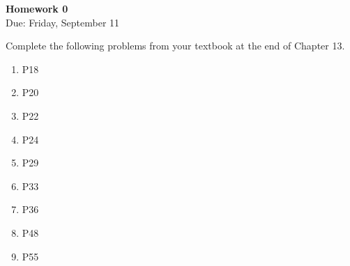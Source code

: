 \documentclass{article}
\begin{document}
\fancyfoot[C]{\thepage}
\vspace*{0cm}
\begin{center}
	{\LARGE \textbf{Homework 0}}\\
	\vspace{0.25cm}
	{\Large Due: Friday, September 11}
\end{center}

Complete the following problems from your textbook at the end of Chapter 13.
\begin{enumerate}
	\item P18
	\item P20
	\item P22
	\item P24
	\item P29
	\item P33
	\item P36
	\item P48
	\item P55
\end{enumerate}
\end{document}
